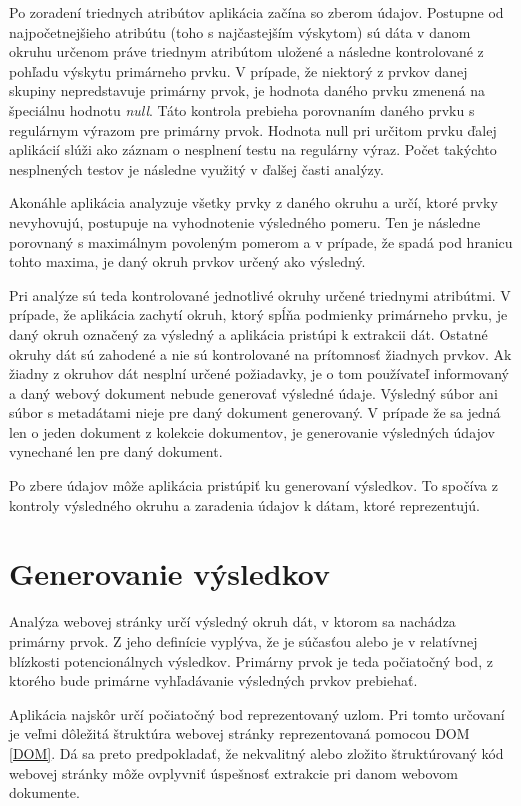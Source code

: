 Po zoradení triednych atribútov aplikácia začína so zberom údajov. Postupne od najpočetnejšieho atribútu (toho s najčastejším výskytom) sú dáta v danom okruhu určenom práve triednym atribútom uložené a následne kontrolované z pohľadu výskytu primárneho prvku. V prípade, že niektorý z prvkov danej skupiny nepredstavuje primárny prvok, je hodnota daného prvku zmenená na špeciálnu hodnotu \textit{null}. Táto kontrola prebieha porovnaním daného prvku s regulárnym výrazom pre primárny prvok. Hodnota null pri určitom prvku ďalej aplikácií slúži ako záznam o nesplnení testu na regulárny výraz. Počet takýchto nesplnených testov je následne využitý v ďalšej časti analýzy.

Akonáhle aplikácia analyzuje všetky prvky z daného okruhu a určí, ktoré prvky nevyhovujú, postupuje na vyhodnotenie výsledného pomeru. Ten je následne porovnaný s maximálnym povoleným pomerom a v prípade, že spadá pod hranicu tohto maxima, je daný okruh prvkov určený ako výsledný.

\bigskip

Pri analýze sú teda kontrolované jednotlivé okruhy určené triednymi atribútmi. V prípade, že aplikácia zachytí okruh, ktorý spĺňa podmienky primárneho prvku, je daný okruh označený za výsledný a aplikácia pristúpi k extrakcii dát. Ostatné okruhy dát sú zahodené a nie sú kontrolované na prítomnosť žiadnych prvkov. Ak žiadny z okruhov dát nesplní určené požiadavky, je o tom používateľ informovaný a daný webový dokument nebude generovať výsledné údaje. Výsledný súbor ani súbor s metadátami nieje pre daný dokument generovaný. V prípade že sa jedná len o jeden dokument z kolekcie dokumentov, je generovanie výsledných údajov vynechané len pre daný dokument.

Po zbere údajov môže aplikácia pristúpiť ku generovaní výsledkov. To spočíva z kontroly výsledného okruhu a zaradenia údajov k dátam, ktoré reprezentujú.

\newpage

\section{Generovanie výsledkov}

Analýza webovej stránky určí výsledný okruh dát, v ktorom sa nachádza primárny prvok. Z jeho definície vyplýva, že je súčasťou alebo je v relatívnej blízkosti potencionálnych výsledkov. Primárny prvok je teda počiatočný bod, z ktorého bude primárne vyhľadávanie výsledných prvkov prebiehať. 

Aplikácia najskôr určí počiatočný bod reprezentovaný uzlom. Pri tomto určovaní je veľmi dôležitá štruktúra webovej stránky reprezentovaná pomocou DOM \ref{DOM}. Dá sa preto predpokladať, že nekvalitný alebo zložito štruktúrovaný kód webovej stránky môže ovplyvniť úspešnosť extrakcie pri danom webovom dokumente. 

